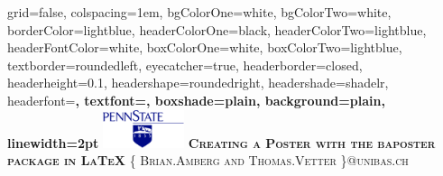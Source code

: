 \documentclass[landscape,final,a0paper,fontscale=0.285]{baposter}
\begin{document}



\begin{poster}%
  {
  grid=false,
  colspacing=1em,
  bgColorOne=white,
  bgColorTwo=white,
  borderColor=lightblue,
  headerColorOne=black,
  headerColorTwo=lightblue,
  headerFontColor=white,
  boxColorOne=white,
  boxColorTwo=lightblue,
  textborder=roundedleft,
  eyecatcher=true,
  headerborder=closed,
  headerheight=0.1\textheight,
  headershape=roundedright,
  headershade=shadelr,
  headerfont=\Large\bf\textsc, %
  textfont={\setlength{\parindent}{1.5em}},
  boxshade=plain,
  background=plain,
  linewidth=2pt
  }
  {\includegraphics[height=3em]{images/psulogo.png}} 
  {\bf\textsc{Creating a Poster with the baposter package in LaTeX} \vspace{0.5em}}
  {\textsc{\{ Brian.Amberg and Thomas.Vetter \}@unibas.ch}}
  {%
  }

    \newcommand{\colouredcircle}{%
      \tikz{\useasboundingbox (-0.2em,-0.32em) rectangle(0.2em,0.32em); \draw[draw=black,fill=lightblue,line width=0.03em] (0,0) circle(0.18em);}}


\end{poster}
\end{document}
